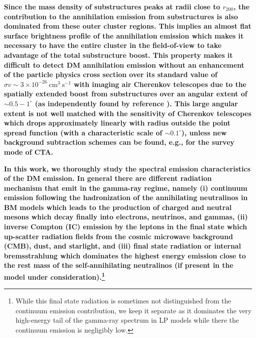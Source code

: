 \documentclass[10pt,aps,pra,reprint,amsmath,amsfonts,amssymb,showpacs,nofootinbib,floatfix]{revtex4-1}
\def\C#1{{\bf #1}}
\newcommand{\degs}{^\circ}
\newcommand{\rvir}{r_{200}}
\begin{document}
{\C{Since the mass density of substructures peaks at radii close to
  $\rvir$, the contribution to the annihilation emission from
  substructures is also dominated from these outer cluster regions.
  This implies an almost flat surface brightness profile of the
  annihilation emission which makes it necessary to have the entire
  cluster in the field-of-view to take advantage of the total
  substructure boost. This property makes it difficult to detect DM
  annihilation emission without an enhancement of the particle physics
  cross section over its standard value of $\sigma v\sim 3\times
  10^{-26} ~\mathrm{cm}^3~\mathrm{s}^{-1}$ with imaging air Cherenkov
  telescopes due to the spatially extended boost from substructures
  over an angular extent of $\sim 0.5-1\degs$ (as independently found
  by reference \cite{2011arXiv1104.3530S}). This large angular extent
  is not well matched with the sensitivity of Cherenkov telescopes
  which drops approximately linearly with radius outside the point
  spread function (with a characteristic scale of $\sim 0.1\degs$),
  unless new background subtraction schemes can be found, e.g., for
  the survey mode of CTA.}

\C{In this work, we thoroughly study the spectral emission
  characteristics of the DM emission. In general there are different
  radiation mechanism that emit in the gamma-ray regime, namely (i)
  continuum emission following the hadronization of the annihilating
  neutralinos in BM models which leads to the production of charged
  and neutral mesons which decay finally into electrons, neutrinos,
  and gammas, (ii) inverse Compton (IC) emission by the leptons in the
  final state which up-scatter radiation fields from the cosmic
  microwave background (CMB), dust, and starlight, and (iii) final
  state radiation or internal bremsstrahlung which dominates the
  highest energy emission close to the rest mass of the
  self-annihilating neutralinos (if present in the model under
  consideration).\footnote{While this final state radiation is
    sometimes not distinguished from the continuum emission
    contribution, we keep it separate as it dominates the very
    high-energy tail of the gamma-ray spectrum in LP models while
    there the continuum emission is negligibly low.}}

}
\end{document}
